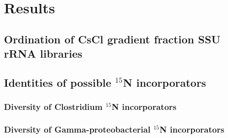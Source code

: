 \section{Results}

\subsection{Ordination of CsCl gradient fraction SSU rRNA libraries}
\subsection{Identities of possible $^{15}$N incorporators}
\subsubsection{Diversity of Clostridium $^{15}$N incorporators}
\subsubsection{Diversity of Gamma-proteobacterial $^{15}$N incorporators}



